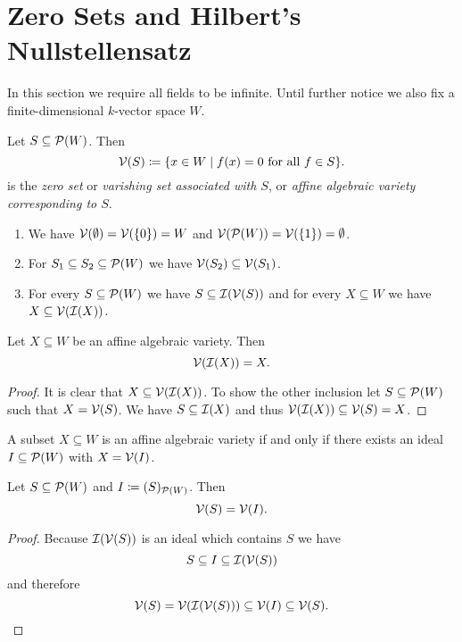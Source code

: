 \section{Zero Sets and Hilbert’s Nullstellensatz}
In this section we require all fields to be infinite. Until further notice we also fix a finite-dimensional $k$-vector space $W$.


\begin{defi}
 Let $S \subseteq \mathcal{P}(W)$. Then
 \[
  \mathcal{V}(S) \coloneqq \{x \in W \mid f(x) = 0 \text{ for all } f \in S\}.
 \]
 is the \emph{zero set} or \emph{varishing set associated with $S$}, or \emph{affine algebraic variety corresponding to $S$}.
\end{defi}


\begin{expls}
 \begin{enumerate}[label=\emph{\alph*)},leftmargin=*]
  \item
   We have $\mathcal{V}(\emptyset) = \mathcal{V}(\{0\}) = W$ and $\mathcal{V}(\mathcal{P}(W)) = \mathcal{V}(\{1\}) = \emptyset$.
  \item
   For $S_1 \subseteq S_2 \subseteq \mathcal{P}(W)$ we have $\mathcal{V}(S_2) \subseteq \mathcal{V}(S_1)$.
  \item
   For every $S \subseteq \mathcal{P}(W)$ we have $S \subseteq \mathcal{I}(\mathcal{V}(S))$ and for every $X \subseteq W$ we have $X \subseteq \mathcal{V}(\mathcal{I}(X))$.
 \end{enumerate}
\end{expls}


\begin{lem}
 Let $X \subseteq W$ be an affine algebraic variety. Then
 \[
  \mathcal{V}(\mathcal{I}(X)) = X.
 \]
\end{lem}
\begin{proof}
 It is clear that $X \subseteq \mathcal{V}(\mathcal{I}(X))$. To show the other inclusion let $S \subseteq \mathcal{P}(W)$ such that $X = \mathcal{V}(S)$. We have $S \subseteq \mathcal{I}(X)$ and thus $\mathcal{V}(\mathcal{I}(X)) \subseteq \mathcal{V}(S) = X$.
\end{proof}


\begin{cor}
 A subset $X \subseteq W$ is an affine algebraic variety if and only if there exists an ideal $I \subseteq \mathcal{P}(W)$ with $X = \mathcal{V}(I)$.
\end{cor}



\begin{cor}
 Let $S \subseteq \mathcal{P}(W)$ and $I \coloneqq (S)_{\mathcal{P}(W)}$. Then
 \[
  \mathcal{V}(S) = \mathcal{V}(I).
 \]
\end{cor}
\begin{proof}
 Because $\mathcal{I}(\mathcal{V}(S))$ is an ideal which contains $S$ we have
 \[
  S \subseteq I \subseteq \mathcal{I}(\mathcal{V}(S))
 \]
 and therefore
 \[
  \mathcal{V}(S) = \mathcal{V}(\mathcal{I}(\mathcal{V}(S))) \subseteq \mathcal{V}(I) \subseteq \mathcal{V}(S).
  \qedhere
 \]
\end{proof}


